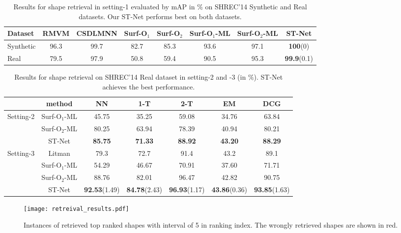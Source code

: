 \documentclass[runningheads]{llncs}
\begin{document}
\begin{table}
\caption{Results for shape retrieval in setting-1 evaluated by mAP in $\%$ on SHREC'14 Synthetic and Real datasets. Our ST-Net performs best on both datasets.}
\begin{center}
\begin{tabular}{|l|| c| c|  c| c| c| c| c|}
\hline
Dataset & RMVM\cite{RMVM} & CSDLMNN\cite{Ioannis}  & Surf-O$_1$ & Surf-O$_2$ & Surf-O$_1$-ML & Surf-O$_2$-ML  & ST-Net\\
\hline
Synthetic & 96.3 & 99.7  & 82.7 &85.3 &93.6 & 97.1  & \textbf{100}(0)\\
Real      & 79.5 & 97.9  & 50.8 &59.4 &90.5 & 95.3  & \textbf{99.9}(0.1)\\
\hline
\end{tabular}
\end{center}
\label{tab:tab3}
\end{table}
\begin{table}
\begin{center}
\caption{Results for shape retrieval on SHREC'14 Real dataset in setting-2 and -3 (in $\%$). ST-Net achieves the best performance.}
\begin{tabular}{|l||c|c|c|c|c|c|}
\hline
         &method & NN & 1-T & 2-T & EM & DCG \\
          \hline
\multirow{3}{*}{Setting-2} & Surf-O$_1$-ML & 45.75 & 35.25& 59.08& 34.76& 63.84\\
 &Surf-O$_2$-ML& 80.25 & 63.94 & 78.39 & 40.94 & 80.21 \\
 &ST-Net& \textbf{85.75} & \textbf{71.33} & \textbf{88.92} & \textbf{43.20} & \textbf{88.29} \\
\hline
\multirow{4}{*}{Setting-3} & Litman\cite{SHREC} & 79.3 & 72.7 & 91.4 & 43.2 & 89.1 \\
&Surf-O$_1$-ML& 54.29  & 46.67 & 70.91  & 37.60  & 71.71  \\
&Surf-O$_2$-ML& 88.76  & 82.01  & 96.47  & 42.82  & 90.75  \\
&ST-Net& \textbf{92.53}(1.49) & \textbf{84.78}(2.43) & \textbf{96.93}(1.17) & \textbf{43.86}(0.36) & \textbf{93.85}(1.63) \\
\hline
\end{tabular}
\label{tab:tabset2}
\end{center}
\end{table}

\begin{figure}[t]
\begin{center}
\texttt{[image: retreival\_results.pdf]}
\caption{Instances of retrieved top ranked shapes with interval of 5 in ranking index.  The wrongly retrieved shapes are shown in  red.}%
\label{fig:retreival_results}
\end{center}
\end{figure}
\end{document}
